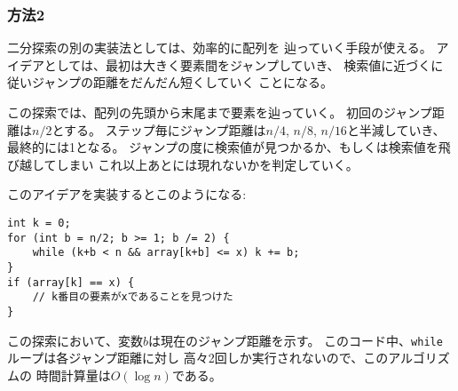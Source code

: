 \subsubsection{方法2}

二分探索の別の実装法としては、効率的に配列を
辿っていく手段が使える。
アイデアとしては、最初は大きく要素間をジャンプしていき、
検索値に近づくに従いジャンプの距離をだんだん短くしていく
ことになる。

この探索では、配列の先頭から末尾まで要素を辿っていく。
初回のジャンプ距離は$n/2$とする。
ステップ毎にジャンプ距離は$n/4$, $n/8$, $n/16$と半減していき、
最終的には1となる。
ジャンプの度に検索値が見つかるか、もしくは検索値を飛び越してしまい
これ以上あとには現れないかを判定していく。

このアイデアを実装するとこのようになる:
\begin{lstlisting}
int k = 0;
for (int b = n/2; b >= 1; b /= 2) {
    while (k+b < n && array[k+b] <= x) k += b;
}
if (array[k] == x) {
    // k番目の要素がxであることを見つけた
}
\end{lstlisting}

\begin{comment}
During the search, the variable $b$
contains the current jump length.
The time complexity of the algorithm is $O(\log n)$,
because the code in the \texttt{while} loop
is performed at most twice for each jump length.
\end{comment}

この探索において、変数$b$は現在のジャンプ距離を示す。
このコード中、\texttt{while}ループは各ジャンプ距離に対し
高々2回しか実行されないので、このアルゴリズムの
時間計算量は$O(\log n)$である。

\begin{comment}
\subsubsection{C++ functions}

The C++ standard library contains the following functions
that are based on binary search and work in logarithmic time:

\begin{itemize}
\item \texttt{lower\_bound} returns a pointer to the
first array element whose value is at least $x$.
\item \texttt{upper\_bound} returns a pointer to the
first array element whose value is larger than $x$.
\item \texttt{equal\_range} returns both above pointers.
\end{itemize}
\end{comment}

